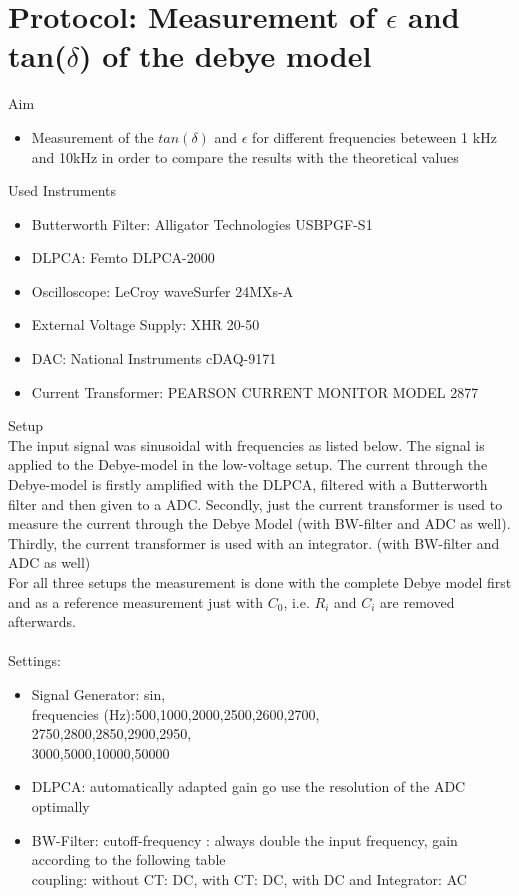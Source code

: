 \section{Protocol: Measurement of $\epsilon$ and tan($\delta$) of the debye model}
{\Large Aim} \\
\begin{itemize}
\item Measurement of the $tan(\delta)$ and $\epsilon$ for different frequencies beteween 1 kHz and 10kHz in order to compare the results with the theoretical values
\end{itemize}
{\Large Used Instruments} 
\begin{itemize}
 \item Butterworth Filter: Alligator Technologies USBPGF-S1
 \item DLPCA: Femto DLPCA-2000
 \item Oscilloscope: LeCroy waveSurfer 24MXs-A
 \item External Voltage Supply:  XHR 20-50
 \item DAC: National Instruments cDAQ-9171
 \item Current Transformer: PEARSON CURRENT
MONITOR MODEL 2877
\end{itemize}
{\Large Setup} \\
The input signal was  sinusoidal with frequencies as listed below. The signal is applied to the Debye-model in the low-voltage setup. The current through the Debye-model is firstly amplified with the DLPCA, filtered with a Butterworth filter and then given to a ADC. Secondly, just the current transformer is used to measure the current through the Debye Model (with BW-filter and ADC as well). Thirdly, the current transformer is used with an integrator. (with BW-filter and ADC as well) \\
For all three setups the measurement is done with the complete Debye model first and as a reference measurement just with $C_0$, i.e. $R_i$ and $C_i$ are removed afterwards.\\ 
\\
{\Large Settings:} 
\begin{itemize}
\item Signal Generator:  sin, \\frequencies (Hz):500,1000,2000,2500,2600,2700,\\
2750,2800,2850,2900,2950,\\
3000,5000,10000,50000
\item DLPCA:  automatically adapted gain go use the resolution of the ADC optimally 
\item BW-Filter:  cutoff-frequency : always double the input frequency, gain according to the following table\\ coupling: without CT: DC, with CT: DC, with DC and Integrator: AC
\end{itemize}
